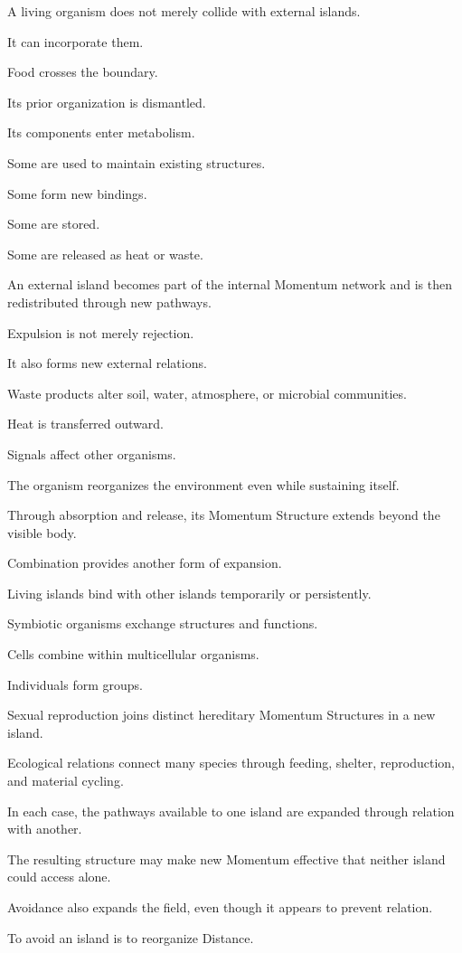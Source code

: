 A living organism does not merely collide with external islands.

It can incorporate them.

Food crosses the boundary.

Its prior organization is dismantled.

Its components enter metabolism.

Some are used to maintain existing structures.

Some form new bindings.

Some are stored.

Some are released as heat or waste.

An external island becomes part of the internal Momentum network and is then redistributed through new pathways.

Expulsion is not merely rejection.

It also forms new external relations.

Waste products alter soil, water, atmosphere, or microbial communities.

Heat is transferred outward.

Signals affect other organisms.

The organism reorganizes the environment even while sustaining itself.

Through absorption and release, its Momentum Structure extends beyond the visible body.

Combination provides another form of expansion.

Living islands bind with other islands temporarily or persistently.

Symbiotic organisms exchange structures and functions.

Cells combine within multicellular organisms.

Individuals form groups.

Sexual reproduction joins distinct hereditary Momentum Structures in a new island.

Ecological relations connect many species through feeding, shelter, reproduction, and material cycling.

In each case, the pathways available to one island are expanded through relation with another.

The resulting structure may make new Momentum effective that neither island could access alone.

Avoidance also expands the field, even though it appears to prevent relation.

To avoid an island is to reorganize Distance.

